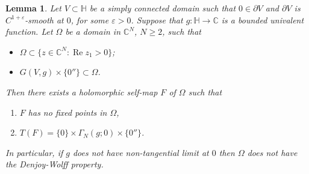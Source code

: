 \documentclass[12pt]{amsart}
\newtheorem{lemma}[theorem]{Lemma}
\theoremstyle{definition}
\theoremstyle{remark}
\numberwithin{equation}{section}
\def\C{\mathbb C}
\def\Ha{\mathbb H}
\renewcommand{\Re}{\operatorname{Re}}
\begin{document}
\begin{lemma}\label{lem:main}
	Let $V \subset \Ha$ be a simply connected domain such that $0\in\partial V$ and $\partial V$ is $C^{1+\varepsilon}$-smooth at $0$, for some $\varepsilon>0$.
	Suppose that $g:\mathbb H \to \C$ is a bounded univalent function. Let $\Omega$ be a  domain in $\mathbb C^N$, $N\geq 2$, such that
\begin{itemize}	
	\item[(i)] $\Omega \subset \{z\in \mathbb{C}^N: \Re z_1> 0\}$;	
	\item[(ii)] $G(V, g)\times\{0''\} \subset \Omega$. 
\end{itemize}		
		Then there exists a holomorphic self-map $F$ of $\Omega$ such that 
\begin{enumerate}
\item $F$ has no fixed points in $\Omega$,
\item $T(F)=\{0\}\times \Gamma_N(g;0)\times \{0''\}$.
\end{enumerate}	
In particular, if $g$ does not have non-tangential limit at $0$ then $\Omega$ does not have the Denjoy-Wolff property.		
\end{lemma}
\end{document}
